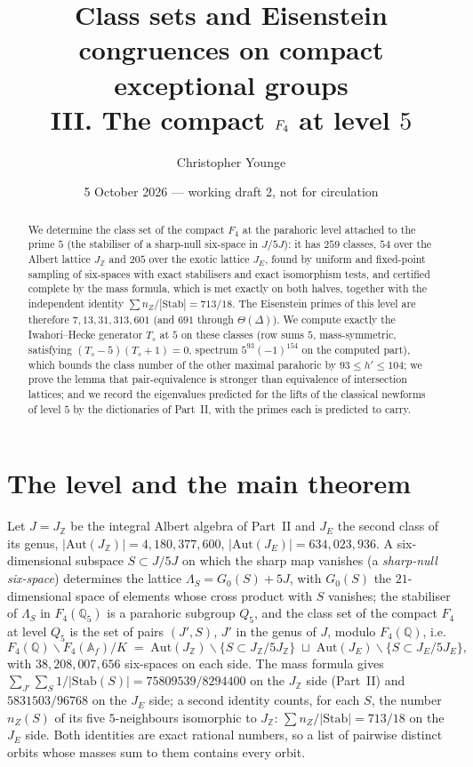 \documentclass[11pt]{article}
\title{Class sets and Eisenstein congruences on compact exceptional groups\\ III. The compact $\Ff$ at level $5$}
\author{Christopher Younge}
\date{5 October 2026 --- working draft 2, not for circulation}
\theoremstyle{definition}\newtheorem{computation}[theorem]{Computation}\newtheorem{remark}[theorem]{Remark}\newtheorem{prediction}[theorem]{Prediction}
\newcommand{\Z}{\mathbb Z}\newcommand{\Q}{\mathbb Q}\newcommand{\F}{\mathbb F}\newcommand{\Ff}{F_4}\newcommand{\Aut}{\mathrm{Aut}}\newcommand{\Stab}{\mathrm{Stab}}
\begin{document}
\maketitle
\begin{abstract}
We determine the class set of the compact $\Ff$ at the parahoric level attached to the prime $5$ (the stabiliser of a sharp-null six-space in $J/5J$): it has $259$ classes, $54$ over the Albert lattice $J_\Z$ and $205$ over the exotic lattice $J_E$, found by uniform and fixed-point sampling of six-spaces with exact stabilisers and exact isomorphism tests, and certified complete by the mass formula, which is met exactly on both halves, together with the independent identity $\sum n_Z/|\Stab|=713/18$. The Eisenstein primes of this level are therefore $7,13,31,313,601$ (and $691$ through $\Theta(\Delta)$). We compute exactly the Iwahori--Hecke generator $T_s$ at $5$ on these classes (row sums $5$, mass-symmetric, satisfying $(T_s-5)(T_s+1)=0$, spectrum $5^{93}(-1)^{154}$ on the computed part), which bounds the class number of the other maximal parahoric by $93\le h'\le104$; we prove the lemma that pair-equivalence is stronger than equivalence of intersection lattices; and we record the eigenvalues predicted for the lifts of the classical newforms of level $5$ by the dictionaries of Part~II, with the primes each is predicted to carry.
\end{abstract}

\section{The level and the main theorem}
Let $J=J_\Z$ be the integral Albert algebra of Part~II and $J_E$ the second class of its genus, $|\Aut(J_\Z)|=4{,}180{,}377{,}600$, $|\Aut(J_E)|=634{,}023{,}936$. A six-dimensional subspace $S\subset J/5J$ on which the sharp map vanishes (a \emph{sharp-null six-space}) determines the lattice $\Lambda_S=G_0(S)+5J$, with $G_0(S)$ the $21$-dimensional space of elements whose cross product with $S$ vanishes; the stabiliser of $\Lambda_S$ in $\Ff(\Q_5)$ is a parahoric subgroup $Q_5$, and the class set of the compact $\Ff$ at level $Q_5$ is the set of pairs $(J',S)$, $J'$ in the genus of $J$, modulo $\Ff(\Q)$, i.e.
\[\Ff(\Q)\backslash\Ff(\mathbb A_f)/K\;=\;\Aut(J_\Z)\backslash\{S\subset J_\Z/5J_\Z\}\;\sqcup\;\Aut(J_E)\backslash\{S\subset J_E/5J_E\},\]
with $38{,}208{,}007{,}656$ six-spaces on each side. The mass formula gives $\sum_{J'}\sum_S 1/|\Stab(S)|=75809539/8294400$ on the $J_\Z$ side (Part~II) and $5831503/96768$ on the $J_E$ side; a second identity counts, for each $S$, the number $n_Z(S)$ of its five $5$-neighbours isomorphic to $J_\Z$: $\sum n_Z/|\Stab|=713/18$ on the $J_E$ side. Both identities are exact rational numbers, so a list of pairwise distinct orbits whose masses sum to them contains every orbit.
\end{document}
